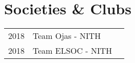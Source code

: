 \documentclass[a4paper]{deedy-resume} %
\begin{document}
\begin{minipage}[t]{0.30\textwidth}
\sectionspace %



\section{Societies \& Clubs} 

\begin{tabular}{rll}
2018 &  Team Ojas - NITH\\
2018 &  Team ELSOC - NITH\\

\end{tabular}

\end{minipage} %
\hfill
%
%
\end{document}
